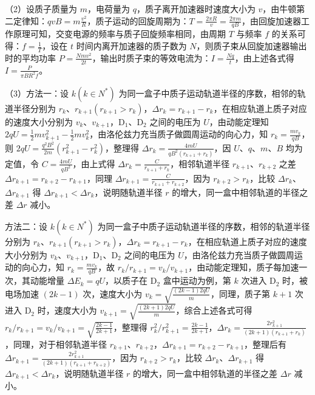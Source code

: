 \documentclass[\gkver]{gaokaozhenti}
\begin{document}
\begin{enumerate}
{（2）设质子质量为 $m$，电荷量为 $q$，质子离开加速器时速度大小为 $v$，由牛顿第二定律知：$qvB=m\frac{v^{2}}{R}$，质子运动的回旋周期为：$T=\frac{2\pi R}{v}=\frac{2\pi m}{qB}$，由回旋加速器工作原理可知，交变电源的频率与质子回旋频率相同，由周期 $T$ 与频率 $f$ 的关系可得：$f=\frac{1}{T}$，设在 $t$ 时间内离开加速器的质子数为 $N$，则质子束从回旋加速器输出时的平均功率 $P=\frac{Nmv^{2}}{2t}$，输出时质子束的等效电流为：$I=\frac{Nq}{t}$，由上述各式得 $I=\frac{P}{\pi BR^{2}f}$。

（3）方法一：设 $k(k\in N^{*})$ 为同一盒子中质子运动轨道半径的序数，相邻的轨道半径分别为 $r_k$、$r_{k+1}(r_{k+1}>r_k)$，$\Delta r_k=r_{k+1}-r_k$，在相应轨道上质子对应的速度大小分别为 $v_k$、$v_{k+1}$，D$_{1}$、D$_{2}$ 之间的电压为 $U$，由动能定理知 $2qU=\frac{1}{2}mv_{k+1}^{2}-\frac{1}{2}mv_k^{2}$，由洛伦兹力充当质子做圆周运动的向心力，知 $r_k=\frac{mv_k}{qB}$，则 $2qU=\frac{q^{2}B^{2}}{2m}(r_{k+1}^{2}-r_k^{2})$，整理得 $\Delta r_k=\frac{4mU}{qB^{2}(r_{k+1}+r_k)}$，因 $U$、$q$、$m$、$B$ 均为定值，令 $C=\frac{4mU}{qB^{2}}$，由上式得 $\Delta r_k=\frac{C}{r_{k+1}+r_k}$，相邻轨道半径 $r_{k+1}$、$r_{k+2}$ 之差 $\Delta r_{k+1}=r_{k+2}-r_{k+1}$，同理 $\Delta r_{k+1}=\frac{C}{r_{k+1}+r_{k+2}}$，因为 $r_{k+2}>r_k$，比较 $\Delta r_k$、$\Delta r_{k+1}$ 得 $\Delta r_{k+1}<\Delta r_k$，说明随轨道半径 $r$ 的增大，同一盒中相邻轨道的半径之差 $\Delta r$ 减小。

方法二：设 $k(k\in N^{*})$ 为同一盒子中质子运动轨道半径的序数，相邻的轨道半径分别为 $r_k$、$r_{k+1}(r_{k+1}>r_k)$，$\Delta r_k=r_{k+1}-r_k$，在相应轨道上质子对应的速度大小分别为 $v_k$、$v_{k+1}$，D$_{1}$、D$_{2}$ 之间的电压为 $U$，由洛伦兹力充当质子做圆周运动的向心力，知 $r_k=\frac{mv_k}{qB}$，故 $r_k/r_{k+1}=v_k/v_{k+1}$，由动能定理知，质子每加速一次，其动能增量 $\Delta E_k=qU$，以质子在 D$_{2}$ 盒中运动为例，第 $k$ 次进入 D$_{2}$ 时，被电场加速 $(2k-1)$ 次，速度大小为 $v_k=\sqrt{\frac{(2k-1)2qU}{m}}$，同理，质子第 $k+1$ 次进入 D$_{2}$ 时，速度大小为 $v_{k+1}=\sqrt{\frac{(2k+1)2qU}{m}}$，综合上述各式可得 $r_k/r_{k+1}=v_k/v_{k+1}=\sqrt{\frac{2k-1}{2k+1}}$，整理得 $r_k^{2}/r_{k+1}^{2}=\frac{2k-1}{2k+1}$，$\Delta r_k=\frac{2r_{k+1}^{2}}{(2k+1)(r_{k+1}+r_k)}$，同理，对于相邻轨道半径 $r_{k+1}$、$r_{k+2}$，$\Delta r_{k+1}=r_{k+2}-r_{k+1}$，整理后有 $\Delta r_{k+1}=\frac{2r_{k+1}^{2}}{(2k+1)(r_{k+1}+r_{k+2})}$，因为 $r_{k+2}>r_k$，比较 $\Delta r_k$、$\Delta r_{k+1}$ 得 $\Delta r_{k+1}<\Delta r_k$，说明随轨道半径 $r$ 的增大，同一盒中相邻轨道的半径之差 $\Delta r$ 减小。
}

\end{enumerate}
\end{document}
